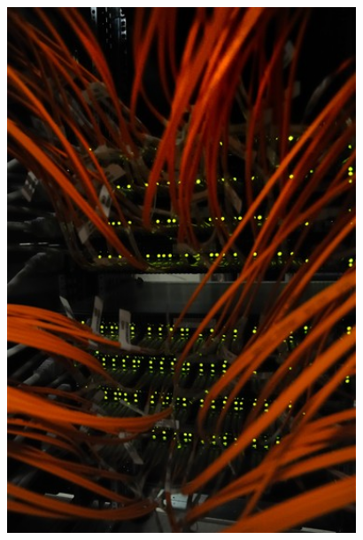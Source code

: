 \begin{frame}
\begin{columns}[T]
\begin{column}{.30\textwidth}
\begin{figure}[htbp]
\begin{center}
\includegraphics[width=0.93\textwidth]{images/1008291_03-A5-at-72-dpi.jpg}
\end{center}
\end{figure}
\end{column}%




\end{columns}


\end{frame}



